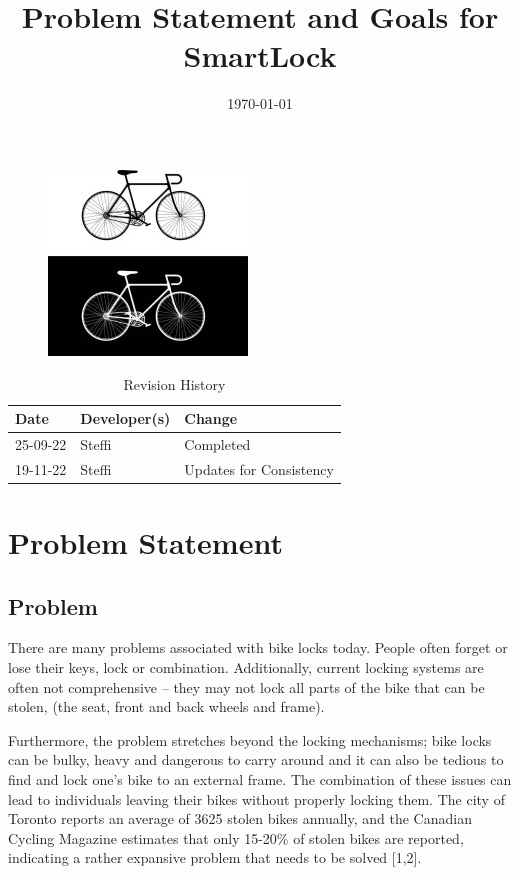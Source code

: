 \documentclass{article}
\title{Problem Statement and Goals for SmartLock\\\progname}
\author{\authname}
\date{\today}
\begin{document}
\maketitle
\thispagestyle{empty}
\begin{figure}[h!]
  \centering
  \includegraphics[width=0.4\linewidth]{../BikeLogo.jpg}
\end{figure}

\newpage
{}
\begin{table}[hp]
\caption{Revision History} \label{TblRevisionHistory}
\begin{tabularx}{\textwidth}{llX}
\toprule
\textbf{Date} & \textbf{Developer(s)} & \textbf{Change}\\
\midrule
25-09-22 & Steffi & Completed\\
19-11-22 & Steffi & Updates for Consistency\\
\bottomrule
\end{tabularx}
\end{table}

\newpage
\tableofcontents

\newpage
{}
\section{Problem Statement}

\subsection{Problem}

There are many problems associated with bike locks today.  People often forget or lose their keys, lock or combination.  Additionally, current locking systems are often not comprehensive – they may not lock all parts of the bike that can be stolen, (the seat, front and back wheels and frame). 

Furthermore, the problem stretches beyond the locking mechanisms; bike locks can be bulky, heavy and dangerous to carry around and it can also be tedious to find and lock one’s bike to an external frame.  The combination of these issues can lead to individuals leaving their bikes without properly locking them.  The city of Toronto reports an average of 3625 stolen bikes annually, and the Canadian Cycling Magazine estimates that only 15-20\% of stolen bikes are reported, indicating a rather expansive problem that needs to be solved [1,2]. 
\end{document}
